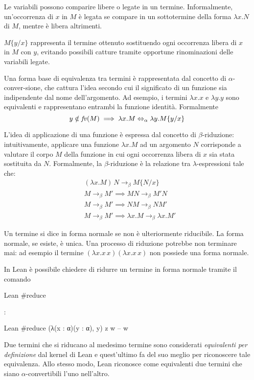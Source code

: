 Le variabili possono comparire libere o legate in un termine. Informalmente, un'occorrenza di $x$ in $M$ è legata se compare in un sottotermine della forma $\lambda x.N$ di $M$, mentre è libera altrimenti.

\begin{comment}
L'insieme delle variabili libere in un termine $M$ è definito induttivamente sulla struttura di $M$ come segue:
$$\text{\emph{fv}}(x) = x \quad \text{\emph{fv}}(\lambda x.M) = \text{\emph{fv}}(M)\setminus\{x\} \quad \text{\emph{fv}}(M N) = \text{\emph{fv}}(M) \cup \text{\emph{fv}}(N)$$
\end{comment}

$M\{y/x\}$ rappresenta il termine ottenuto sostituendo ogni occorrenza libera di $x$ in $M$ con $y$, evitando possibili catture tramite opportune rinominazioni delle variabili legate.

Una forma base di equivalenza tra termini è rappresentata dal concetto di $\alpha$-conver-sione, che cattura l'idea secondo cui il significato di un funzione sia indipendente dal nome dell'argomento. Ad esempio, i termini $\lambda x.x$ e $\lambda y.y$ sono equivalenti e rappresentano entrambi la funzione identità. Formalmente
$$y \notin \text{\emph{fv}}(M) \implies \lambda x.M \Leftrightarrow_{\alpha} \lambda y.M\{y/x\}$$

L'idea di applicazione di una funzione è espressa dal concetto di $\beta$-riduzione: intuitivamente, applicare una funzione $\lambda x.M$ ad un argomento $N$ corrisponde a valutare il corpo $M$ della funzione in cui ogni occorrenza libera di $x$ sia stata sostituita da $N$. Formalmente, la $\beta$-riduzione è la relazione tra $\lambda$-espressioni tale che:
\begin{align*}
    & (\lambda x.M)\,N \rightarrow_{\beta} M\{N/x\} \\
    & M \rightarrow_{\beta} M' \implies M N \rightarrow_{\beta} M' N \\
    & M \rightarrow_{\beta} M' \implies N M \rightarrow_{\beta} N M' \\
    & M \rightarrow_{\beta} M' \implies \lambda x.M \rightarrow_{\beta} \lambda x.M'
\end{align*}

Un termine si dice in forma normale se non è ulteriormente riducibile. La forma normale, se esiste, è unica. Una processo di riduzione potrebbe non terminare mai: ad esempio il termine $(\lambda x. x\,x) (\lambda x. x\,x)$ non possiede una forma normale.

In Lean è possibile chiedere di ridurre un termine in forma normale tramite il comando \begin{mintinline}{Lean} #reduce \end{mintinline}:
\begin{code}{Lean}
#reduce (λ(x : α)(y : α), y) z w
-- w
\end{code}
Due termini che si riducano al medesimo termine sono considerati \emph{equivalenti per definizione} dal kernel di Lean e quest'ultimo fa del suo meglio per riconoscere tale equivalenza. Allo stesso modo, Lean riconosce come equivalenti due termini che siano $\alpha$-convertibili l'uno nell'altro.

